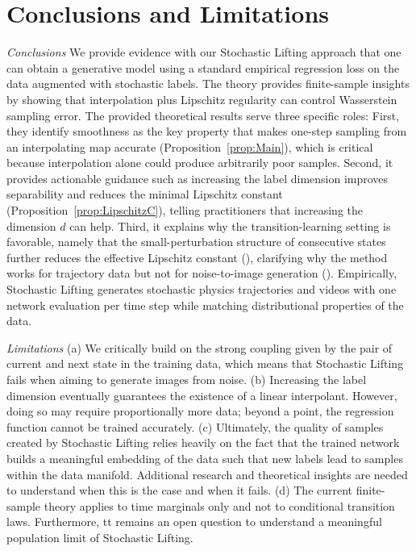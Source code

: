 \documentclass{article}
\theoremstyle{plain}
\theoremstyle{definition}
\theoremstyle{remark}
\begin{document}
\vspace*{-0.15cm}\section{Conclusions and Limitations}
\label{sec:conclusion}
\emph{Conclusions} We provide evidence with our Stochastic Lifting approach that one can obtain a generative model using a standard empirical regression loss on the data augmented with stochastic labels.
The theory provides finite-sample insights by showing that interpolation plus Lipschitz regularity can control Wasserstein sampling error. The provided theoretical results serve three specific roles: First, they identify smoothness as the key property that makes one-step sampling from an interpolating map accurate (Proposition~\ref{prop:Main}), which is critical because interpolation alone could produce arbitrarily poor samples. Second, it provides actionable guidance such as increasing the label dimension improves separability and reduces the minimal Lipschitz constant (Proposition~\ref{prop:LipschitzC}), telling practitioners that increasing the dimension $d$ can help. Third, it explains why the transition-learning setting is favorable, namely that the small-perturbation structure of consecutive states further reduces the effective Lipschitz constant (), clarifying why the method works for trajectory data but not for noise-to-image generation ().
Empirically, Stochastic Lifting generates stochastic physics trajectories and videos with one network evaluation per time step while matching distributional properties of the data. 

\emph{Limitations} (a) We critically build on the strong coupling given by the pair of current and next state in the training data, which means that Stochastic Lifting fails when aiming to generate images from noise.
(b) Increasing the label dimension eventually guarantees the existence of a linear interpolant. However, doing so may require proportionally more data; beyond a point, the regression function cannot be trained accurately.
(c) Ultimately, the quality of samples created by Stochastic Lifting relies heavily on the fact that the trained network builds a meaningful embedding of the data such that new labels lead to samples within the data manifold. Additional research and theoretical insights are needed to understand when this is the case and when it fails. (d) The current finite-sample theory applies to time marginals only and not to conditional transition laws. Furthermore, tt remains an open question to understand a meaningful population limit of Stochastic Lifting.   
\end{document}
